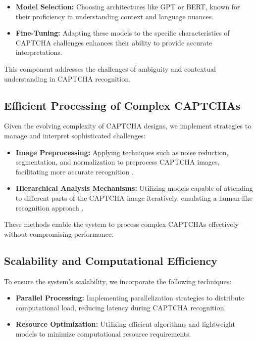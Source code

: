 \documentclass[sigconf]{acmart}
\begin{document}
\begin{itemize}
    \item \textbf{Model Selection:} Choosing architectures like GPT or BERT, known for their proficiency in understanding context and language nuances.
    \item \textbf{Fine-Tuning:} Adapting these models to the specific characteristics of CAPTCHA challenges enhances their ability to provide accurate interpretations.
\end{itemize}

This component addresses the challenges of ambiguity and contextual understanding in CAPTCHA recognition.

\subsection{Efficient Processing of Complex CAPTCHAs}

Given the evolving complexity of CAPTCHA designs, we implement strategies to manage and interpret sophisticated challenges:

\begin{itemize}
    \item \textbf{Image Preprocessing:} Applying techniques such as noise reduction, segmentation, and normalization to preprocess CAPTCHA images, facilitating more accurate recognition \cite{turn0search7}.
    \item \textbf{Hierarchical Analysis Mechanisms:} Utilizing models capable of attending to different parts of the CAPTCHA image iteratively, emulating a human-like recognition approach \cite{turn0academia11}.
\end{itemize}

These methods enable the system to process complex CAPTCHAs effectively without compromising performance.

\subsection{Scalability and Computational Efficiency}

To ensure the system's scalability, we incorporate the following techniques:

\begin{itemize}
    \item \textbf{Parallel Processing:} Implementing parallelization strategies to distribute computational load, reducing latency during CAPTCHA recognition.
    \item \textbf{Resource Optimization:} Utilizing efficient algorithms and lightweight models to minimize computational resource requirements.
\end{itemize}
\end{document}
